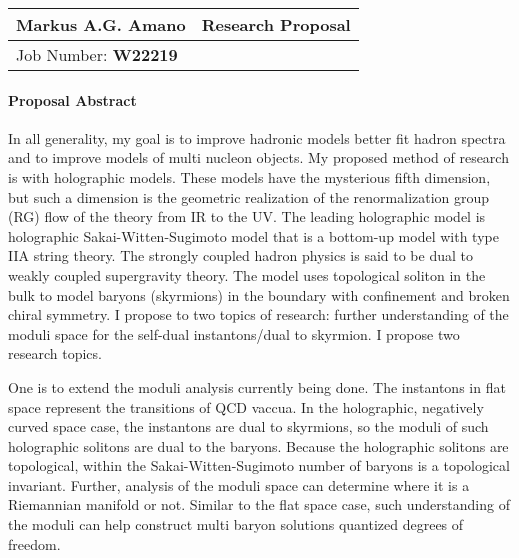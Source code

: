 \documentclass[12pt]{article}
\begin{document}
\begin{center}
  \begin{tabularx}{\textwidth} { 
      >{\raggedright\arraybackslash}X 
    >{\raggedleft\arraybackslash}X  }
    \huge Markus A.G. Amano & Research Proposal\\
    \hline
    Job Number: \textbf{W22219} & \\
  \end{tabularx}
\end{center}

\paragraph{Proposal Abstract}

In all generality, my goal is to improve hadronic models better fit hadron spectra and to improve models of multi nucleon objects. 
%
My proposed method of research is with holographic models.
%
These models have the mysterious fifth dimension, but such a dimension is the geometric realization of the renormalization group (RG) flow of the theory from IR to the UV.
%
The leading holographic model is holographic Sakai-Witten-Sugimoto model that is a bottom-up model with type IIA string theory.
%
The strongly coupled hadron physics is said to be dual to weakly coupled supergravity theory.
%
The model uses topological soliton in the bulk to model baryons (skyrmions) in the boundary with confinement and broken chiral symmetry.
%
I propose to two topics of research: further understanding of the moduli space for the self-dual instantons/dual to skyrmion.
%
I propose two research topics.

One is to extend the moduli analysis currently being done.
%
The instantons in flat space represent the transitions of QCD vaccua.
%
In the holographic, negatively curved space case, the instantons are dual to skyrmions, so the moduli of such holographic solitons are dual to the baryons.
%
Because the holographic solitons are topological, within the Sakai-Witten-Sugimoto number of baryons is a topological invariant.
%
Further, analysis of the moduli space can determine where it is a Riemannian manifold or not.
%
Similar to the flat space case, such understanding of the moduli can help construct multi baryon solutions quantized degrees of freedom.

\end{document}
